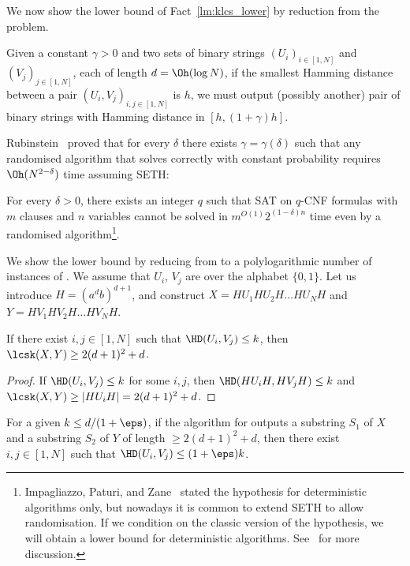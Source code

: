 We now show the lower bound of Fact~\ref{lm:klcs_lower} by reduction from the \Bichromatic problem.

\begin{problem}[\Bichromatic]\label{pr:bichromatic}
Given a constant $\gamma > 0$ and two sets of binary strings $(U_i)_{i \in [1,N]}$ and $(V_j)_{j \in [1,N]}$, each of length $d = \Oh(\log N)$, if the smallest Hamming distance between a pair $(U_i,V_j)_{i,j \in [1,N]}$ is $h$, we must output (possibly another) pair of binary strings with Hamming distance in $[h, (1+\gamma)h]$.
\end{problem}

Rubinstein~\cite{DBLP:journals/corr/abs-1803-00904} proved that for every $\delta$ there exists $\gamma = \gamma (\delta)$ such that any randomised algorithm that solves \Bichromatic correctly with constant probability requires $\Oh(N^{2-\delta})$ time assuming SETH:

\begin{hypothesis}[SETH]
For every $\delta > 0$, there exists an integer $q$ such that SAT on $q$-CNF formulas with $m$ clauses and  $n$ variables cannot be solved in $m^{O(1)} 2^{(1-\delta) n}$ time even by a randomised algorithm\footnote{Impagliazzo, Paturi, and Zane~\cite{DBLP:journals/jcss/ImpagliazzoPZ01} stated the hypothesis for deterministic algorithms only, but nowadays it is common to extend SETH to allow randomisation. If we condition on the classic version of the hypothesis, we will obtain a lower bound for deterministic algorithms. See~\cite{SETH_survey} for more discussion.}.
\end{hypothesis}

We show the lower bound by reducing from \Bichromatic to a polylogarithmic number of instances of \kApproxLCS. We assume that $U_i$, $V_j$ are over the alphabet $\{0,1\}$. Let us introduce $H=(a^d b)^{d+1}$, and construct $X = H U_1 H U_2 H \ldots H U_N H$ and $Y = H V_1 H V_2 H \ldots H V_N H$.

\begin{observation}\label{obs:bichro_lcs}
If there exist $i,j \in [1,N] $ such that $\HD(U_i,V_j) \leq k$, then  $\lcsk(X,Y) \geq 2(d+1)^2 + d$.
\end{observation}
\begin{proof}
If $\HD(U_i,V_j) \leq k$ for some $i, j$, then $\HD(HU_iH,HV_jH)  \leq k$ and $\lcsk(X,Y) \geq |H U_i H| = 2(d+1)^2 + d$.
\end{proof}

\begin{lemma} \label{lm:bichro_lcs}
For a given $k \leq d/(1+\eps)$, if the algorithm for \kApproxLCS outputs a substring $S_1$ of $X$ and a substring $S_2$ of $Y$ of length $\geq 2(d+1)^2 + d$, then there exist $i,j \in [1,N] $ such that $\HD(U_i,V_j) \leq (1+\eps)k$.
\end{lemma}

